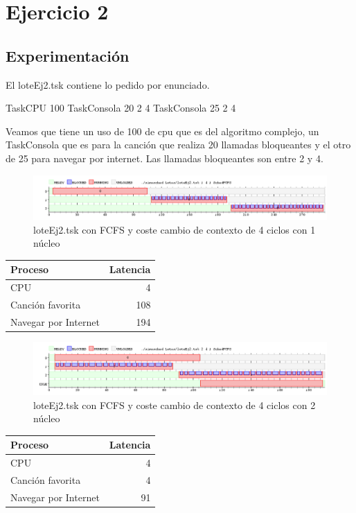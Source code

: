 
\section{Ejercicio 2}


\subsection{Experimentación}
El loteEj2.tsk contiene lo pedido por enunciado.

TaskCPU 100  
TaskConsola 20 2 4  
TaskConsola 25 2 4

Veamos que tiene un uso de 100 de cpu que es del algoritmo complejo, un TaskConsola que es para la canción que realiza 20 llamadas bloqueantes y el otro de 25 para navegar por
internet. Las llamadas bloqueantes son entre 2 y 4.

\begin{figure}[H]
  \centering
    \includegraphics[width=1.1\textwidth]{imagenes/Ej2Experimento1core.png}
  \caption{loteEj2.tsk con FCFS y coste cambio de contexto de 4 ciclos con 1 núcleo}
\end{figure}

\begin{tabular}{l | r }
  Proceso & Latencia\\
  \hline
  CPU & 4\\
  Canción favorita & 108\\
  Navegar por Internet & 194\\
\end{tabular}

\begin{figure}[H]
  \centering
    \includegraphics[width=1.1\textwidth]{imagenes/Ej2Experimento2core.png}
  \caption{loteEj2.tsk con FCFS y coste cambio de contexto de 4 ciclos con 2 núcleo}
\end{figure}

\begin{tabular}{l | r }
  Proceso & Latencia\\
  \hline
  CPU & 4\\
  Canción favorita & 4\\
  Navegar por Internet & 91\\
\end{tabular}

